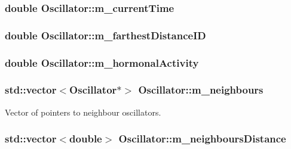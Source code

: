 \hypertarget{class_oscillator_abe68e99fc990a44b9bd234751eec0f24}{
\subsubsection[{m\+\_\+current\+Time}]{\setlength{\rightskip}{0pt plus 5cm}double Oscillator\+::m\+\_\+current\+Time}}\label{class_oscillator_abe68e99fc990a44b9bd234751eec0f24}
\hypertarget{class_oscillator_a216d83f43397708641a00c38d75570d3}{
\subsubsection[{m\+\_\+farthest\+Distance\+I\+D}]{\setlength{\rightskip}{0pt plus 5cm}double Oscillator\+::m\+\_\+farthest\+Distance\+I\+D}}\label{class_oscillator_a216d83f43397708641a00c38d75570d3}
\hypertarget{class_oscillator_a80a2b0beda0d17f549160fbbd456243b}{
\subsubsection[{m\+\_\+hormonal\+Activity}]{\setlength{\rightskip}{0pt plus 5cm}double Oscillator\+::m\+\_\+hormonal\+Activity}}\label{class_oscillator_a80a2b0beda0d17f549160fbbd456243b}
\hypertarget{class_oscillator_ac6add7bad19c62071ad1ce651b815e4e}{
\subsubsection[{m\+\_\+neighbours}]{\setlength{\rightskip}{0pt plus 5cm}std\+::vector$<${\bf Oscillator}$\ast$$>$ Oscillator\+::m\+\_\+neighbours}}\label{class_oscillator_ac6add7bad19c62071ad1ce651b815e4e}


Vector of pointers to neighbour oscillators. 

\hypertarget{class_oscillator_a7031173912bc2225997a3ab6f9995fec}{
\subsubsection[{m\+\_\+neighbours\+Distance}]{\setlength{\rightskip}{0pt plus 5cm}std\+::vector$<$double$>$ Oscillator\+::m\+\_\+neighbours\+Distance}}\label{class_oscillator_a7031173912bc2225997a3ab6f9995fec}


